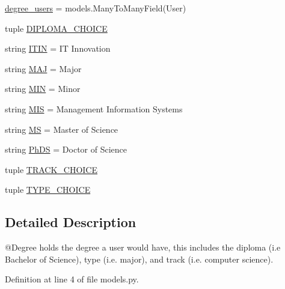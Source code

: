 \begin{DoxyCompactItemize}
\mbox{\hyperlink{classlanding_1_1models_1_1Degree_ab548201fcb3ef2b2455ba7311fdfcb26}{degree\+\_\+users}} = models.\+Many\+To\+Many\+Field(User)
\item 
tuple \mbox{\hyperlink{classlanding_1_1models_1_1Degree_a7972b49cb5153c95f5a5d509de3b1135}{D\+I\+P\+L\+O\+M\+A\+\_\+\+C\+H\+O\+I\+CE}}
\item 
string \mbox{\hyperlink{classlanding_1_1models_1_1Degree_a0d92d2c83362111ad3cf7ee19d107897}{I\+T\+IN}} = \textquotesingle{}IT Innovation\textquotesingle{}
\item 
string \mbox{\hyperlink{classlanding_1_1models_1_1Degree_ad19df1851aacc963e0bc67c2a7097aec}{M\+AJ}} = \textquotesingle{}Major\textquotesingle{}
\item 
string \mbox{\hyperlink{classlanding_1_1models_1_1Degree_af38536acc307300df46363d93eb48b24}{M\+IN}} = \textquotesingle{}Minor\textquotesingle{}
\item 
string \mbox{\hyperlink{classlanding_1_1models_1_1Degree_a88793e29b02916081124dfba858b598e}{M\+IS}} = \textquotesingle{}Management Information Systems\textquotesingle{}
\item 
string \mbox{\hyperlink{classlanding_1_1models_1_1Degree_ae9b848406afe10cc7edb6dfcc4a78d1d}{MS}} = \textquotesingle{}Master of Science\textquotesingle{}
\item 
string \mbox{\hyperlink{classlanding_1_1models_1_1Degree_a324175b93dbc6add6feb3e954b2a7b6b}{Ph\+DS}} = \textquotesingle{}Doctor of Science\textquotesingle{}
\item 
tuple \mbox{\hyperlink{classlanding_1_1models_1_1Degree_a63995a5c2aa1f03f1328238ebbd7ecd2}{T\+R\+A\+C\+K\+\_\+\+C\+H\+O\+I\+CE}}
\item 
tuple \mbox{\hyperlink{classlanding_1_1models_1_1Degree_a2e0c65757b0f59ed5c62ee8b2d517300}{T\+Y\+P\+E\+\_\+\+C\+H\+O\+I\+CE}}
\end{DoxyCompactItemize}


\subsection{Detailed Description}
\begin{DoxyVerb}@Degree holds the degree a user would have, this includes the
        diploma (i.e Bachelor of Science), type (i.e. major),
        and track (i.e. computer science).
\end{DoxyVerb}
 

Definition at line 4 of file models.\+py.



